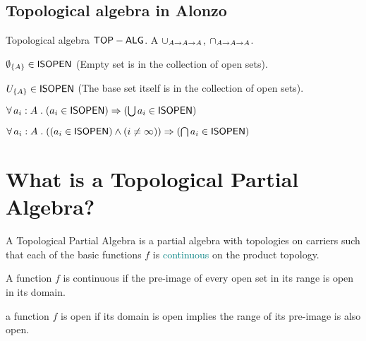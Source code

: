 \documentclass[11pt,fleqn]{article}
\begin{document}
\subsection{Topological algebra in Alonzo}
\begin{theory-def}{Topological algebra}
    {$\mathsf{TOP-ALG}$.}
    {A}
    {$\cup_{{A} \rightarrow {{A} \rightarrow {A}}}$, $\cap_{{A} \rightarrow {{A} \rightarrow {A}}}$.}
    {
    \be
        \item $\emptyset_{\{ A\} } \in \mathsf{ISOPEN} $
        \hfill (Empty set is in the collection of open sets).
        \item  $U_{ \{ A\} } \in \mathsf{ISOPEN} $ \hfill (The base set itself is in the collection of open sets).
        \item $\forall\, a_i : A \mathrel{.} (a_i \in \mathsf{ISOPEN}) \Rightarrow (\bigcup a_i \in \mathsf{ISOPEN})$ 
        \item $\forall\, a_i : A \mathrel{.} ((a_i \in \mathsf{ISOPEN}) \land (i \neq \infty)) \Rightarrow (\bigcap a_i \in \mathsf{ISOPEN})$
    \ee
    }
\end{theory-def}

\section{What is a Topological Partial Algebra?}

\begin{df}
A Topological Partial Algebra is a partial algebra with topologies on carriers such that each of the basic functions $f$ is \textcolor{teal}{continuous} on the product topology.
\end{df}

\begin{df}
  A function $f$ is continuous if the pre-image of every open set in its range is open in its domain.
\end{df}

\begin{df}
  a function $f$ is open if its domain is open implies the range of its pre-image is also open.
\end{df}
\end{document}
